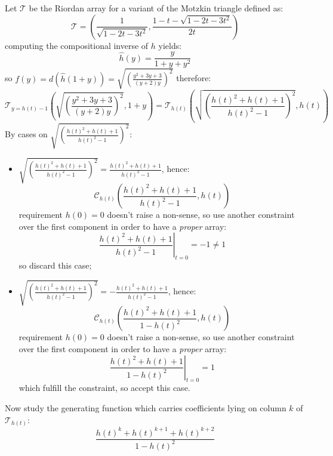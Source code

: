 \documentclass[11pt,a4paper]{article} %
\begin{document}
    Let $\mathcal{T}$ be the Riordan array for a variant of the 
    Motzkin triangle defined as:
    \begin{displaymath} 
        \mathcal{T} = \left(\frac{1}{\sqrt{1-2t-3t^2}}, 
           \frac{1-t-\sqrt{1-2t-3t^2}}{2t}  \right)
    \end{displaymath} 
    computing the compositional inverse of $h$ yields:
    \begin{displaymath} 
        \hat{h}(y) = \frac{y}{1+y+y^2}
    \end{displaymath} 
    so $f(y)=d(\hat{h}(1+y))=\sqrt{\left(\frac{y^2+3y+3}{(y+2)y}\right)^{2}}$ therefore:
    \begin{displaymath} 
        \mathcal{T}_{y=h(t)-1}\left( \sqrt{\left(\frac{y^2+3y+3}{(y+2)y}\right)^{2}}, 1+y \right) = 
            \mathcal{T}_{h(t)}\left( \sqrt{\left(\frac{h(t)^2+h(t)+1}{h(t)^2-1}\right)^{2}}, h(t) \right) 
    \end{displaymath} 
    By cases on $\sqrt{\left(\frac{h(t)^2+h(t)+1}{h(t)^2-1}\right)^{2}}$:
    \begin{itemize}
        \item $\sqrt{\left(\frac{h(t)^2+h(t)+1}{h(t)^2-1}\right)^{2}}=\frac{h(t)^2+h(t)+1}{h(t)^2-1}$, hence:
            \begin{displaymath} 
                \mathcal{C}_{h(t)}\left(\frac{h(t)^2+h(t)+1}{h(t)^2-1}, h(t) \right)
            \end{displaymath} 
            requirement $h(0)=0$ doesn't raise a non-sense, so use another 
            constraint over the first component in order to have a 
            \emph{proper} array:
            \begin{displaymath}
                \left. \frac{h(t)^2+h(t)+1}{h(t)^2-1} \right|_{t=0} = -1 \not= 1 
            \end{displaymath} 
            so discard this case;
        \item $\sqrt{\left(\frac{h(t)^2+h(t)+1}{h(t)^2-1}\right)^{2}}=-\frac{h(t)^2+h(t)+1}{h(t)^2-1}$, hence:
            \begin{displaymath}
                \mathcal{C}_{h(t)}\left(\frac{h(t)^2+h(t)+1}{1-h(t)^2}, h(t) \right)
            \end{displaymath} 
            requirement $h(0)=0$ doesn't raise a non-sense, so use another 
            constraint over the first component in order to have a 
            \emph{proper} array:
            \begin{displaymath}
                \left. \frac{h(t)^2+h(t)+1}{1-h(t)^2} \right|_{t=0} = 1 
            \end{displaymath} 
            which fulfill the constraint, so accept this case.
    \end{itemize}
    Now study the generating function which carries coefficients lying on column $k$
    of $\mathcal{T}_{h(t)}$:
    \begin{displaymath} 
        \frac{h(t)^{k}+h(t)^{k+1}+h(t)^{k+2}}{1-h(t)^2 }
    \end{displaymath} 
\end{document}
